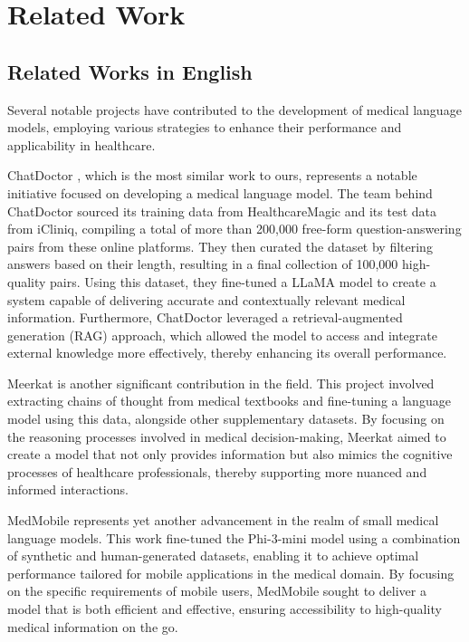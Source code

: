 \documentclass[conference]{IEEEtran}
\begin{document}
\section{Related Work}

\subsection{Related Works in English}
Several notable projects have contributed to the development of medical language models, employing various strategies to enhance their performance and applicability in healthcare.

ChatDoctor
\cite{b6}, which is the most similar work to ours, represents a notable initiative focused on developing a medical language model. The team behind ChatDoctor sourced its training data from HealthcareMagic and its test data from iCliniq, compiling a total of more than 200,000 free-form question-answering pairs from these online platforms. They then curated the dataset by filtering answers based on their length, resulting in a final collection of 100,000 high-quality pairs. Using this dataset, they fine-tuned a LLaMA model \cite{b7} to create a system capable of delivering accurate and contextually relevant medical information. Furthermore, ChatDoctor leveraged a retrieval-augmented generation (RAG) approach, which allowed the model to access and integrate external knowledge more effectively, thereby enhancing its overall performance.

Meerkat
\cite{b8}
is another significant contribution in the field. This project involved extracting chains of thought from medical textbooks and fine-tuning a language model using this data, alongside other supplementary datasets. By focusing on the reasoning processes involved in medical decision-making, Meerkat aimed to create a model that not only provides information but also mimics the cognitive processes of healthcare professionals, thereby supporting more nuanced and informed interactions.

MedMobile
\cite{b9}
represents yet another advancement in the realm of small medical language models. This work fine-tuned the Phi-3-mini model
\cite{b10}
using a combination of synthetic and human-generated datasets, enabling it to achieve optimal performance tailored for mobile applications in the medical domain. By focusing on the specific requirements of mobile users, MedMobile sought to deliver a model that is both efficient and effective, ensuring accessibility to high-quality medical information on the go.
\end{document}
